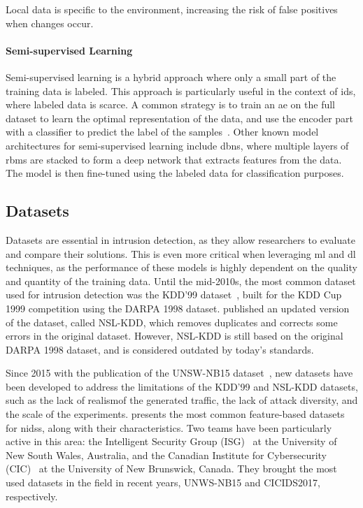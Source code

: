 \begin{challenge}
  Local data is specific to the environment, increasing the risk of false positives when changes occur.
  \label{chall:specificity}
\end{challenge}


\paragraph{Semi-supervised Learning}

Semi-supervised learning is a hybrid approach where only a small part of the training data is labeled.
This approach is particularly useful in the context of \gls{ids}, where labeled data is scarce.
A common strategy is to train an \gls{ae} on the full dataset to learn the optimal representation of the data, and use the encoder part with a classifier to predict the label of the samples~\cite{aouedi_SemisupervisedStackedAutoencoder_2020}.
Other known model architectures for semi-supervised learning include \glspl{dbn}, where multiple layers of \glspl{rbm} are stacked to form a deep network that extracts features from the data.
The model is then fine-tuned using the labeled data for classification purposes.


\subsection{Datasets\label{sec:bg.ids.datasets}}

Datasets are essential in intrusion detection, as they allow researchers to evaluate and compare their solutions.
This is even more critical when leveraging \gls{ml} and \gls{dl} techniques, as the performance of these models is highly dependent on the quality and quantity of the training data.
Until the mid-2010s, the most common dataset used for intrusion detection was the {KDD'99} dataset~\cite{kddcup99}, built for the KDD Cup 1999 competition using the DARPA 1998 dataset.
\Textcite{tavallaee_detailedanalysisKDD_2009} published an updated version of the dataset, called NSL-KDD, which removes duplicates and corrects some errors in the original dataset.
However, NSL-KDD is still based on the original DARPA 1998 dataset, and is considered outdated by today's standards.

Since 2015 with the publication of the UNSW-NB15 dataset~\cite{moustafa_UNSWNB15comprehensivedata_2015}, new datasets have been developed to address the limitations of the KDD'99 and NSL-KDD datasets, such as the lack of realism\footnotemark of the generated traffic, the lack of attack diversity, and the scale of the experiments.
 presents the most common feature-based datasets for \glspl{nids}, along with their characteristics.
Two teams have been particularly active in this area: the Intelligent Security Group (ISG)~\cite{moustafa_UNSWNB15comprehensivedata_2015,koroniotis_developmentrealisticbotnet_2019,moustafa_newdistributedarchitecture_2021} at the University of New South Wales, Australia, and the Canadian Institute for Cybersecurity (CIC)~\cite{sharafaldin_GeneratingNewIntrusion_2018} at the University of New Brunswick, Canada.
They brought the most used datasets in the field in recent years, UNWS-NB15 and CICIDS2017, respectively.

